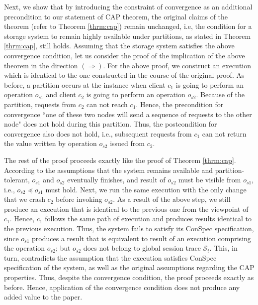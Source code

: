 \documentclass[journal,compsoc]{IEEEtran}
\begin{document}
 \par Next, we show that by introducing the constraint of convergence as an additional precondition to our statement of CAP theorem, the original claims of the theorem (refer to Theorem  \ref{thrm:cap}) remain unchanged, i.e, the condition for a storage system to remain highly available under partitions, as stated in Theorem \ref{thrm:cap}, still holds.   Assuming that the storage system satisfies the above convergence condition, let us consider the proof of the implication of the above theorem in the direction $(\Rightarrow)$. For the above proof, we construct an execution which is identical to the one constructed in the course of the original proof. As before, a partition occurs at the instance when  client $c_1$ is going to perform an operation $o_{s1}$ and client $c_2$ is going to perform an operation $o_{s2}$. Because of the partition, requests from $c_2$ can not reach $c_1$. Hence, the precondition for convergence ``one of these two nodes will send a sequence of requests to the other node" does not hold during this partition. Thus, the postcondition for convergence also does not hold, i.e., subsequent requests from $c_1$ can not return the value written by operation $o_{s2}$ issued from $c_2$. 
 \par The rest of the proof proceeds exactly like the proof of Theorem \ref{thrm:cap}. According to the assumptions that the system remains available and partition-tolerant, $o_{s1}$ and $o_{s2}$ eventually finishes, and result of $o_{s2}$ must be visible from $o_{s1}$, i.e., $o_{s2}\preccurlyeq o_{s1}$ must hold. Next, we run the same execution with the only change that we crash $c_2$ before invoking $o_{s2}$. As a result of the above step, we still produce an execution that is identical to the previous one from the viewpoint of $c_1$. Hence, $c_1$ follows the same path of execution and produces results identical to the previous execution. Thus, the system fails to satisfy its ConSpec specification, since $o_{s1}$  produces a result that is equivalent to result of an execution comprising the operation $o_{s2}$; but  $o_{s2}$ does not belong to global session trace $\mathcal{S}_t$. This, in turn, contradicts the assumption that the execution satisfies ConSpec specification of the system, as well as the original assumptions regarding the CAP properties. Thus, despite the convergence condition, the proof proceeds exactly as before. Hence, application of the convergence condition does not produce any added value to the paper.  
\end{document}
